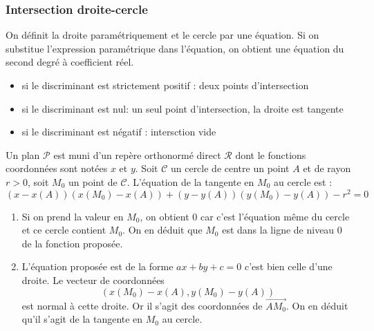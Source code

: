 \subsubsection{Intersection droite-cercle}
On définit la droite paramétriquement et le cercle par une équation. Si on substitue l'expression paramétrique dans l'équation, on obtient une équation du second degré à coefficient réel.
\begin{itemize}
 \item si le discriminant est strictement positif : deux points d'intersection
 \item si le discriminant est nul: un seul point d'intersection, la droite est tangente
 \item si le discriminant est négatif : intersction vide
\end{itemize}
\begin{prop}
 Un plan $\mathcal{P}$ est muni d'un repère orthonormé direct $\mathcal{R}$ dont le fonctions coordonnées sont notées $x$ et $y$. Soit $\mathcal C$ un cercle de centre un point $A$ et de rayon $r>0$, soit $M_0$ un point de $\mathcal C$. L'équation de la tangente en $M_0$ au cercle est :
\begin{displaymath}
 \left( x-x(A)\right) \left( x(M_0)-x(A)\right) + \left( y-y(A)\right) \left( y(M_0)-y(A)\right) - r^2 = 0 
\end{displaymath}
\end{prop}
\begin{demo}
 \begin{enumerate}
  \item Si on prend la valeur en $M_0$, on obtient $0$ car c'est l'équation même du cercle et ce cercle contient $M_0$. On en déduit que $M_0$ est dans la ligne de niveau $0$ de la  fonction proposée. 
  \item L'équation proposée est de la forme $ax+by+c=0$ c'est bien celle d'une droite. Le vecteur de coordonnées
\begin{displaymath}
 \left( x(M_0)-x(A), y(M_0)-y(A)\right) 
\end{displaymath}
 est normal à cette droite. Or il s'agit des coordonnées de $\overrightarrow{AM_0}$. On en déduit qu'il s'agit de la tangente en $M_0$ au cercle.
 \end{enumerate}

\end{demo}


